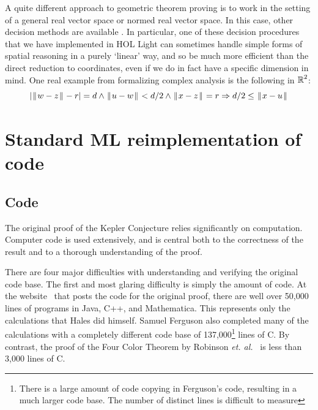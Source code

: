 \documentclass[11pt]{amsart}
\def\|{{\hskip0.1em|\hskip-0.1em|\hskip0.1em}}
\newcommand{\real}{\mbox{$\protect\mathbb R$}}
\let\And=\wedge                    %
\newcommand{\Imp}{\Rightarrow}
\begin{document}
A quite different approach to geometric theorem proving is to work in the
setting of a general real vector space or normed real vector space. In this
case, other decision methods are available \cite{solovay-jointpaper}. In
particular, one of these decision procedures that we have implemented in HOL
Light can sometimes handle simple forms of spatial reasoning in a purely
`linear' way, and so be much more efficient than the direct reduction to
coordinates, even if we do in fact have a specific dimension in mind. One
real example from formalizing complex analysis is the following in $\real^2$:
$$ |\|w - z\| - r| = d \And \|u - w\| < d/2 \And \|x - z\| = r
   \Imp d/2 \leq \|x - u\|
$$




\section{Standard ML reimplementation of code}
\label{sec:code}

\subsection*{Code}




The original proof of the Kepler
Conjecture relies significantly
on computation. Computer code is used extensively, and is
central both to the correctness of the result and to a thorough
understanding of the proof. 

  There are four major difficulties with understanding and verifying
the original code base. The first and most glaring difficulty is
simply the amount of code. At the website~\cite{website:Hales:1998:Code}
that posts the code for the original proof,
there are well over 50,000 lines of programs in Java, C++, and
Mathematica. This represents only the calculations that Hales did himself.
Samuel Ferguson also completed many of the calculations with a completely
different code base of 137,000\footnote{There is a large amount of
code copying in Ferguson's code, resulting in a much larger code base.
The number of distinct lines is difficult to measure} lines of C. By
contrast, the proof of the Four Color Theorem by Robinson \textit{et.
al.}~\cite{Robertson:1997:JCTB} is less than 3,000 lines of C.
\end{document}
